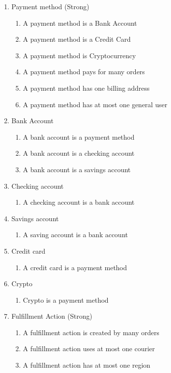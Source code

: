 \documentclass{article}
\begin{document}
\begin{enumerate}
\item Payment method (Strong)
\begin{enumerate}
	\item A payment method is a Bank Account
	\item A payment method is a Credit Card
	\item A payment method is Cryptocurrency
	\item A payment method pays for many orders
	\item A payment method has one billing address
	\item A payment method has at most one general user
\end{enumerate}
	
\item Bank Account
\begin{enumerate}
	\item A bank account is a payment method
	\item A bank account is a checking account
	\item A bank account is a savings account
\end{enumerate}
	
\item Checking account
\begin{enumerate}
	\item A checking account is a bank account
\end{enumerate}
	
\item Savings account
\begin{enumerate}
	\item A saving account is a bank account
\end{enumerate}
	
\item Credit card
\begin{enumerate}
	\item A credit card is a payment method
\end{enumerate}
	
\item Crypto
\begin{enumerate}
	\item Crypto is a payment method
\end{enumerate}
	
\item Fulfillment Action (Strong)
\begin{enumerate}
	\item A fulfillment action is created by many orders
	\item A fulfillment action uses at most one courier
	\item A fulfillment action has at most one region
\end{enumerate}
	

\end{enumerate}
\end{document}
